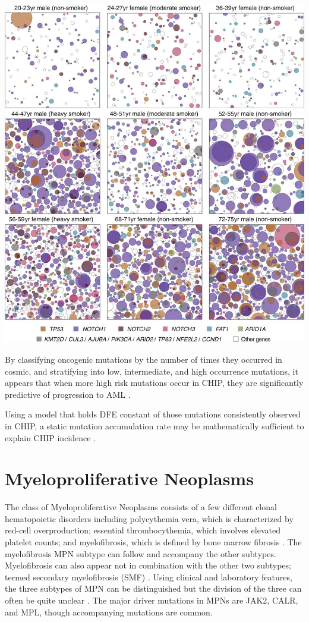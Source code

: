 \documentclass[]{book}
\begin{document}
\includegraphics{images/04-5.jpg}

By classifying oncogenic mutations by the number of times they occurred
in cosmic, and stratifying into low, intermediate, and high occurrence
mutations, it appears that when more high risk mutations occur in CHIP,
they are significantly predictive of progression to AML
\citep{abelson2018prediction}.

Using a model that holds DFE constant of those mutations consistently
observed in CHIP, a static mutation accumulation rate may be
mathematically sufficient to explain CHIP incidence
\citep{Watson2019-lg}.

\section{Myeloproliferative
Neoplasms}\label{myeloproliferative-neoplasms}

The class of Myeloproliferative Neoplasms consists of a few different
clonal hematopoietic disorders including polycythemia vera, which is
characterized by red-cell overproduction; essential thrombocythemia,
which involves elevated platelet counts; and myelofibrosis, which is
defined by bone marrow fibrosis \citep{grinfeld2018classification}. The
myelofibrosis MPN subtype can follow and accompany the other subtypes.
Myelofibrosis can also appear not in combination with the other two
subtypes; termed secondary myelofibrosis (SMF)
\citep{mesa2012epidemiology}. Using clinical and laboratory features,
the three subtypes of MPN can be distinguished but the division of the
three can often be quite unclear
\citep{wilkins2008bone, tefferi2014overview}. The major driver mutations
in MPNs are JAK2, CALR, and MPL, though accompanying mutations are
common.
\end{document}

